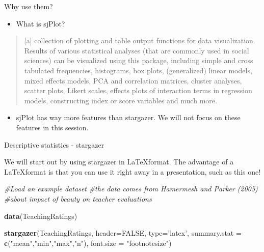 \documentclass[
  10pt,
  ignorenonframetext,
]{beamer}
\newenvironment{Shaded}{\begin{snugshade}}{\end{snugshade}}
\newcommand{\CommentTok}[1]{\textcolor[rgb]{0.56,0.35,0.01}{\textit{#1}}}
\newcommand{\DataTypeTok}[1]{\textcolor[rgb]{0.13,0.29,0.53}{#1}}
\newcommand{\KeywordTok}[1]{\textcolor[rgb]{0.13,0.29,0.53}{\textbf{#1}}}
\newcommand{\NormalTok}[1]{#1}
\newcommand{\OtherTok}[1]{\textcolor[rgb]{0.56,0.35,0.01}{#1}}
\newcommand{\StringTok}[1]{\textcolor[rgb]{0.31,0.60,0.02}{#1}}
\providecommand{\tightlist}{%
  \setlength{\itemsep}{0pt}\setlength{\parskip}{0pt}}
\begin{document}
\begin{frame}{Why use them?}
\protect\hypertarget{why-use-them-1}{}

\begin{itemize}
\tightlist
\item
  What is sjPlot?
\end{itemize}

\begin{quote}
{[}a{]} collection of plotting and table output functions for data
visualization. Results of various statistical analyses (that are
commonly used in social sciences) can be visualized using this package,
including simple and cross tabulated frequencies, histograms, box plots,
(generalized) linear models, mixed effects models, PCA and correlation
matrices, cluster analyses, scatter plots, Likert scales, effects plots
of interaction terms in regression models, constructing index or score
variables and much more.
\end{quote}

\begin{itemize}
\tightlist
\item
  sjPlot has way more features than stargazer. We will not focus on
  these features in this session.
\end{itemize}

\end{frame}

\begin{frame}[fragile]{Descriptive statistics - stargazer}
\protect\hypertarget{descriptive-statistics---stargazer}{}

We will start out by using stargazer in \LaTeX format. The advantage of
a \LaTeX format is that you can use it right away in a presentation,
such as this one!

\begin{Shaded}
\begin{Highlighting}[]
\CommentTok{#Load an example dataset}
\CommentTok{#the data comes from Hamermesh and Parker (2005)}
\CommentTok{#about impact of beauty on teacher evaluations}

\KeywordTok{data}\NormalTok{(TeachingRatings)}

\KeywordTok{stargazer}\NormalTok{(TeachingRatings, }
          \DataTypeTok{header=}\OtherTok{FALSE}\NormalTok{, }\DataTypeTok{type=}\StringTok{'latex'}\NormalTok{,}
          \DataTypeTok{summary.stat =} \KeywordTok{c}\NormalTok{(}\StringTok{"mean"}\NormalTok{,}\StringTok{"min"}\NormalTok{,}\StringTok{"max"}\NormalTok{,}\StringTok{"n"}\NormalTok{), }
          \DataTypeTok{font.size =} \StringTok{"footnotesize"}\NormalTok{)}
\end{Highlighting}
\end{Shaded}

\end{frame}
\end{document}

